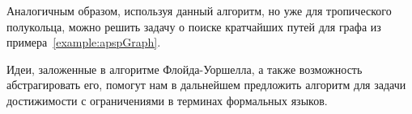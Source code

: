 Аналогичным образом, используя данный алгоритм, но уже для тропического полукольца, можно решить задачу о поиске кратчайших путей для графа из примера~\ref{example:apspGraph}.

Идеи, заложенные в алгоритме Флойда-Уоршелла, а также возможность абстрагировать его, помогут нам в дальнейшем предложить алгоритм для задачи достижимости с ограничениями в терминах формальных языков.




